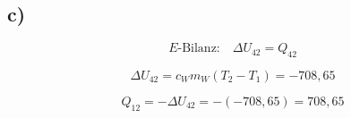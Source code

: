 

\subsection*{c)}

\[
E\text{-Bilanz:} \quad \Delta U_{42} = Q_{42}
\]

\[
\Delta U_{42} = c_{W} m_{W} (T_{2} - T_{1}) = -708,65
\]

\[
Q_{12} = -\Delta U_{42} = -(-708,65) = 708,65
\]